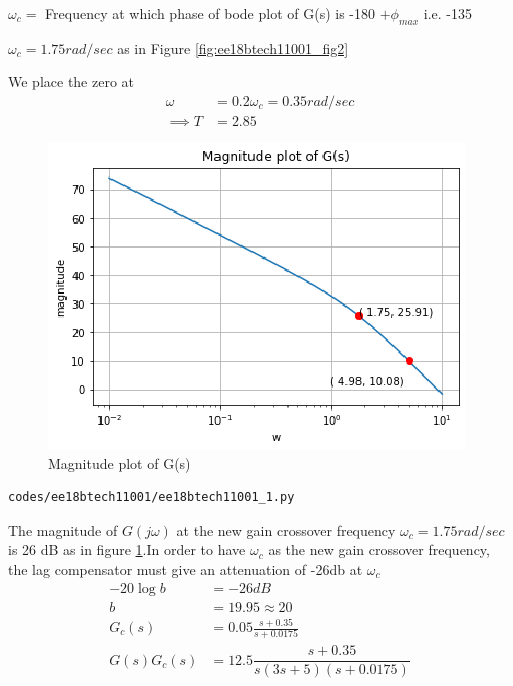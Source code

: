 $\omega_{c} = $ Frequency at which phase of bode plot of G(s) is -180 $+ \phi_{max}$ i.e. -135 \degree

$\omega_{c}  = 1.75 rad/sec$  as in Figure \ref{fig:ee18btech11001_fig2}

We place the zero at 
\begin{align} 
   \omega &= 0.2\omega_{c} = 0.35 rad/sec 
   \\
   \implies T &= 2.85
\end{align}
\begin{figure}[!ht]
\centering
    \includegraphics[width=\columnwidth]{./figs/ee18btech11001/ee18btech11001_2.eps}
  \caption{Magnitude plot of G(s)}
  \label{fig:ee18btech11001_fig3}
\end{figure}
\begin{lstlisting}
codes/ee18btech11001/ee18btech11001_1.py
\end{lstlisting}

The magnitude of $G(j\omega)$ at the new gain crossover frequency  $\omega_{c} = 1.75 rad/sec$ is 26 dB as in figure \ref{fig:ee18btech11001_fig3}.In order to have $\omega_{c}$  as the new gain crossover frequency, the lag compensator
must give an attenuation of -26db at $\omega_{c}$
\begin{align}
    -20 \log{b} &= -26dB
    \\
    b &= 19.95 \approx 20
    \\
    G_{c}(s) &=  0.05\frac{s + 0.35}{s + 0.0175}
    \\
    G(s)G_{c}(s) &= 12.5 \dfrac{s+0.35}{s(3s+5)(s+0.0175)} \label{eq:ee18btech11001_12}
\end{align}


